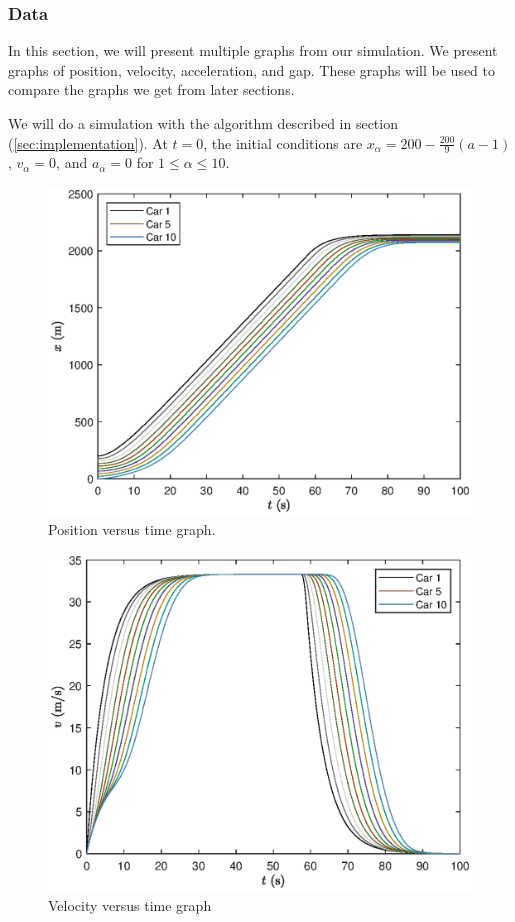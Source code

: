 \documentclass[12pt]{article}
\begin{document}
    \subsubsection{Data}
    In this section, we will present multiple graphs from our simulation. We present graphs of position, velocity, acceleration, and gap. These graphs will be used to compare the graphs we get from later sections. 
    
    We will do a simulation with the algorithm described in section (\ref{sec:implementation}). At $t=0$, the initial conditions are $x_\alpha = 
    200-\frac{200}{9}\left(a-1\right)$, $v_\alpha = 0$, and $a_\alpha = 0$ for $1 \leq \alpha \leq 10$. 
      \begin{figure}[H]
          \includegraphics[width=13cm]{HomogeneousTraffic1.eps}
          \centering
          \caption{Position versus time graph.}
      \end{figure}

      \begin{figure}[H]
        \includegraphics[width=13cm]{HomogeneousTraffic2.eps}
        \centering
        \caption{Velocity versus time graph}
      \end{figure}
\end{document}
